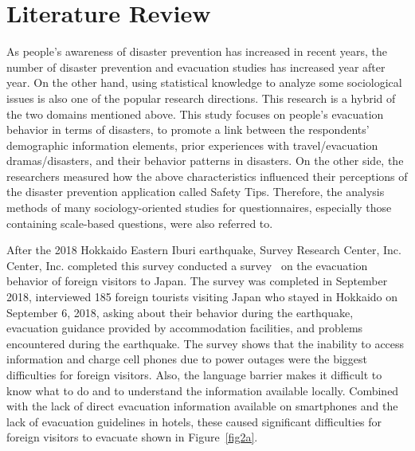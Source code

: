 

\chapter{Literature Review}
\label{c2}

As people's awareness of disaster prevention has increased in recent years, the number of disaster prevention and evacuation studies has increased year after year. On the other hand, using statistical knowledge to analyze some sociological issues is also one of the popular research directions. This research is a hybrid of the two domains mentioned above. This study focuses on people's evacuation behavior in terms of disasters, to promote a link between the respondents' demographic information elements, prior experiences with travel/evacuation dramas/disasters, and their behavior patterns in disasters. On the other side, the researchers measured how the above characteristics influenced their perceptions of the disaster prevention application called Safety Tips. Therefore, the analysis methods of many sociology-oriented studies for questionnaires, especially those containing scale-based questions, were also referred to. 

After the 2018 Hokkaido Eastern Iburi earthquake, Survey Research Center, Inc. Center, Inc. completed this survey conducted a survey~\cite{ref50} on the evacuation behavior of foreign visitors to Japan. The survey was completed in September 2018,  interviewed 185 foreign tourists visiting Japan who stayed in Hokkaido on September 6, 2018, asking about their behavior during the earthquake, evacuation guidance provided by accommodation facilities, and problems encountered during the earthquake. The survey shows that the inability to access information and charge cell phones due to power outages were the biggest difficulties for foreign visitors. Also, the language barrier makes it difficult to know what to do and to understand the information available locally. Combined with the lack of direct evacuation information available on smartphones and the lack of evacuation guidelines in hotels, these caused significant difficulties for foreign visitors to evacuate shown in Figure~\ref{fig2a}. 

